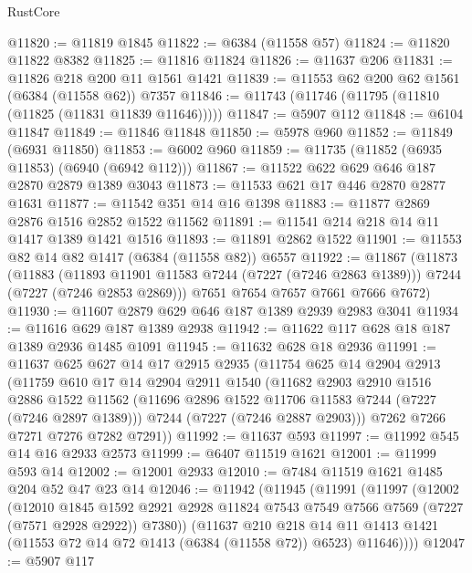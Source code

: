 \begin{lexlean}{RustCore}
\begin{coremodule}
@11820 := @11819 @1845
@11822 := @6384 (@11558 @57)
@11824 := @11820 @11822 @8382
@11825 := @11816 @11824
@11826 := @11637 @206
@11831 := @11826 @218 @200 @11 @1561 @1421
@11839 := @11553 @62 @200 @62 @1561 (@6384 (@11558 @62)) @7357
@11846 := @11743 (@11746 (@11795 (@11810 (@11825 (@11831 @11839 @11646)))))
@11847 := @5907 @112
@11848 := @6104 @11847
@11849 := @11846 @11848
@11850 := @5978 @960
@11852 := @11849 (@6931 @11850)
@11853 := @6002 @960
@11859 := @11735 (@11852 (@6935 @11853) (@6940 (@6942 @112)))
@11867 := @11522 @622 @629 @646 @187 @2870 @2879 @1389 @3043
@11873 := @11533 @621 @17 @446 @2870 @2877 @1631
@11877 := @11542 @351 @14 @16 @1398
@11883 := @11877 @2869 @2876 @1516 @2852 @1522 @11562
@11891 := @11541 @214 @218 @14 @11 @1417 @1389 @1421 @1516
@11893 := @11891 @2862 @1522
@11901 := @11553 @82 @14 @82 @1417 (@6384 (@11558 @82)) @6557
@11922 := @11867
    (@11873
      (@11883
        (@11893 @11901 @11583 @7244 (@7227 (@7246 @2863 @1389)))
        @7244
        (@7227 (@7246 @2853 @2869)))
      @7651
      @7654
      @7657
      @7661
      @7666
      @7672)
@11930 := @11607 @2879 @629 @646 @187 @1389 @2939 @2983 @3041
@11934 := @11616 @629 @187 @1389 @2938
@11942 := @11622 @117 @628 @18 @187 @1389 @2936 @1485 @1091
@11945 := @11632 @628 @18 @2936
@11991 := @11637
    @625
    @627
    @14
    @17
    @2915
    @2935
    (@11754
      @625
      @14
      @2904
      @2913
      (@11759
        @610
        @17
        @14
        @2904
        @2911
        @1540
        (@11682
          @2903
          @2910
          @1516
          @2886
          @1522
          @11562
          (@11696 @2896 @1522 @11706 @11583 @7244 (@7227 (@7246 @2897 @1389)))
          @7244
          (@7227 (@7246 @2887 @2903)))
        @7262
        @7266
        @7271
        @7276
        @7282
        @7291))
@11992 := @11637 @593
@11997 := @11992 @545 @14 @16 @2933 @2573
@11999 := @6407 @11519 @1621
@12001 := @11999 @593 @14
@12002 := @12001 @2933
@12010 := @7484 @11519 @1621 @1485 @204 @52 @47 @23 @14
@12046 := @11942
    (@11945
      (@11991
        (@11997
          (@12002
            (@12010
              @1845
              @1592
              @2921
              @2928
              @11824
              @7543
              @7549
              @7566
              @7569
              (@7227 (@7571 @2928 @2922))
              @7380))
          (@11637
            @210
            @218
            @14
            @11
            @1413
            @1421
            (@11553 @72 @14 @72 @1413 (@6384 (@11558 @72)) @6523)
            @11646))))
@12047 := @5907 @117

\end{coremodule}
\end{lexlean}

